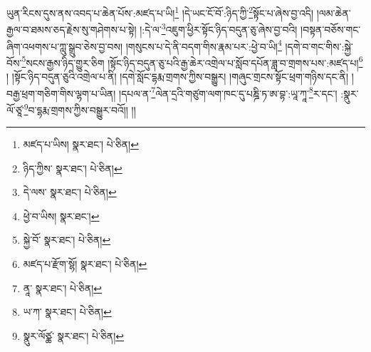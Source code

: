 ཡུན་རིངས་དུས་ནས་འབད་པ་ཆེན་པོས་:མཛད་པ་ཡི།\footnote{མཛད་པ་ཡིས།  སྣར་ཐང་།  པེ་ཅིན། } །དེ་ཡང་ངོ་བོ་:ཉིད་ཀྱི་\footnote{ཉིད་ཀྱིས་  སྣར་ཐང་།  པེ་ཅིན། }སྟོང་པ་ཞེས་བྱ་འདི། །ལམ་ཆེན་རྒྱལ་བ་ཐམས་ཅད་རྗེས་སུ་གཤེགས་པ་སྟེ། །:དེ་ལ་\footnote{དེ་ལས་  སྣར་ཐང་།  པེ་ཅིན། }འཇུག་ཕྱིར་སྟོང་ཉིད་བདུན་ཅུ་ཞེས་བྱ་བའི། །བསྟན་བཅོས་གང་ཞིག་འཕགས་པ་ཀླུ་སྒྲུབ་ཅེས་བྱ་བས། །གསུངས་པ་དེ་ནི་བདག་གིས་རྣམ་པར་:ཕྱེ་བ་ཡི།\footnote{ཕྱེ་བ་ཡིས།  སྣར་ཐང་། } །དགེ་བ་གང་གིས་:སྐྱེ་བོས་\footnote{སྐྱེ་བོ་  སྣར་ཐང་།  པེ་ཅིན། }སངས་རྒྱས་ཉིད་གྱུར་ཅིག །སྟོང་ཉིད་བདུན་ཅུ་པའི་རྒྱ་ཆེར་འགྲེལ་པ་སློབ་དཔོན་ཟླ་བ་གྲགས་པས་:མཛད་པ།\footnote{མཛད་པ་རྫོག་སྷོ།  སྣར་ཐང་།  པེ་ཅིན། } ། །སྟོང་ཉིད་བདུན་ཅུའི་འགྲེལ་པ་ནི། །དགེ་སློང་དྷརྨ་གྲགས་ཀྱིས་བསྒྱུར། །གཞུང་གྲངས་སྟོང་ཕྲག་གཉིས་དང་ནི། །བརྒྱ་ཕྲག་གཅིག་གིས་ལྷག་པ་ཡིན། །དཔལ་ན་\footnote{ནཱ་  སྣར་ཐང་།  པེ་ཅིན། }ལེན་དྲའི་གཙུག་ལག་ཁང་དུ་པཎྜི་ཏ་ཨ་བྷ་:ཡཱ་ཀཱ་\footnote{ཡ་ཀ་  སྣར་ཐང་།  པེ་ཅིན། }ར་དང་། :སྣུར་ལོ་ཙཱ་\footnote{སྣུར་ལོཙྪ་  སྣར་ཐང་།  པེ་ཅིན། }བ་དྷརྨ་གྲགས་ཀྱིས་བསྒྱུར་བའོ།། །།